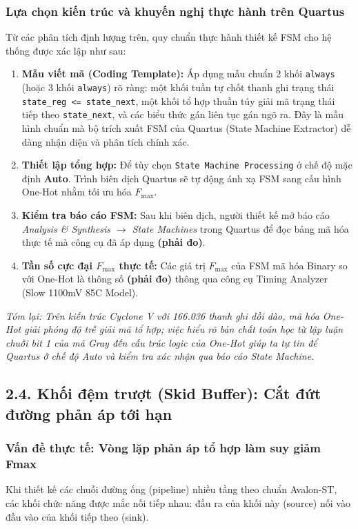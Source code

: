 \subsubsection*{Lựa chọn kiến trúc và khuyến nghị thực hành trên Quartus}
Từ các phân tích định lượng trên, quy chuẩn thực hành thiết kế FSM cho hệ thống được xác lập như sau:
\begin{enumerate}[leftmargin=1.5em, itemsep=2pt]
    \item \textbf{Mẫu viết mã (Coding Template):} Áp dụng mẫu chuẩn 2 khối \texttt{always} (hoặc 3 khối \texttt{always}) rõ ràng: một khối tuần tự chốt thanh ghi trạng thái \texttt{state\_reg <= state\_next}, một khối tổ hợp thuần túy giải mã trạng thái tiếp theo \texttt{state\_next}, và các biểu thức gán liên tục gán ngõ ra. Đây là mẫu hình chuẩn mà bộ trích xuất FSM của Quartus (State Machine Extractor) dễ dàng nhận diện và phân tích chính xác.
    \item \textbf{Thiết lập tổng hợp:} Để tùy chọn \texttt{State Machine Processing} ở chế độ mặc định \textbf{Auto}. Trình biên dịch Quartus sẽ tự động ánh xạ FSM sang cấu hình One-Hot nhằm tối ưu hóa $F_{\max}$.
    \item \textbf{Kiểm tra báo cáo FSM:} Sau khi biên dịch, người thiết kế mở báo cáo \emph{Analysis \& Synthesis $\to$ State Machines} trong Quartus để đọc bảng mã hóa thực tế mà công cụ đã áp dụng \textbf{(phải đo)}.
    \item \textbf{Tần số cực đại $F_{\max}$ thực tế:} Các giá trị $F_{\max}$ của FSM mã hóa Binary so với One-Hot là thông số \textbf{(phải đo)} thông qua công cụ Timing Analyzer (Slow 1100mV 85C Model).
\end{enumerate}

\textit{Tóm lại: Trên kiến trúc Cyclone V với 166.036 thanh ghi dồi dào, mã hóa One-Hot giải phóng độ trễ giải mã tổ hợp; việc hiểu rõ bản chất toán học từ lập luận chuỗi bit 1 của mã Gray đến cấu trúc logic của One-Hot giúp ta tự tin để Quartus ở chế độ Auto và kiểm tra xác nhận qua báo cáo State Machine.}

\subsection*{2.4. Khối đệm trượt (Skid Buffer): Cắt đứt đường phản áp tới hạn}

\subsubsection*{Vấn đề thực tế: Vòng lặp phản áp tổ hợp làm suy giảm Fmax}
Khi thiết kế các chuỗi đường ống (pipeline) nhiều tầng theo chuẩn Avalon-ST, các khối chức năng được mắc nối tiếp nhau: đầu ra của khối này (source) nối vào đầu vào của khối tiếp theo (sink). 


